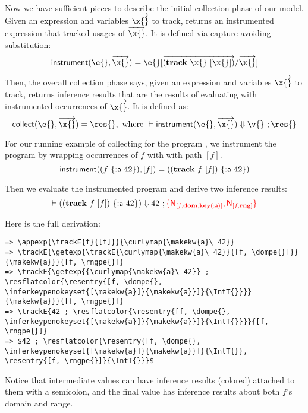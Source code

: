 Now we have sufficient pieces to describe the initial collection phase of our model.
Given an expression \e{} and variables ${\overrightarrow{\x{}}}$ to track,
\instrumentnoalign{\e{}}{\overrightarrow{\x{}}}{\ep{}}
returns an instrumented expression \ep{}
that tracked usages of $\overrightarrow{\x{}}$.
It is defined via capture-avoiding substitution:
$$
\instrumentnoalign{\e{}}{\overrightarrow{\x{}}}{\replacefor{\e{}}{\overrightarrow{\trackE{\x{}}{[\x{}]}}}{\overrightarrow{\x{}}}}
$$

Then, the overall collection phase 
\collectnoalign{\e{}}{\overrightarrow{\x{}}}{\res{}}
says, given an expression \e{}
and variables
$\overrightarrow{\x{}}$
to track,
returns inference results {\res{}}
that are the results of evaluating \e{}
with instrumented occurrences of $\overrightarrow{\x{}}$.
It is defined as:
%
$$
\collectnoalign{\e{}}{\overrightarrow{\x{}}}{\res{}}, \text{ where }
  \opsemtrack{}{\instrument{\e{}}{\overrightarrow{\x{}}}}{\v{}}{\res{}}
$$

For our running example
of collecting for the program ,
we instrument the program by wrapping occurrences of $f$ with \trackEOp{}
with path $[f]$.
$$
\instrumentnoalign{\appexp{f}{\curlymap{\makekw{a}\ 42}}}{[f]}{\appexp{\trackE{f}{[f]}}{\curlymap{\makekw{a}\ 42}}}
$$

Then we evaluate the instrumented program and derive two inference results:
$$
\opsemtrack{}{\appexp{\trackE{f}{[f]}}{\curlymap{\makekw{a}\ 42}}}{42}{\resflatcolor{\resentry{[f, \dompe{}, \inferkeypenokeyset{[\makekw{a}]}{\makekw{a}}]}{\IntT{}}, \resentry{[f, \rngpe{}]}{\IntT{}}}}
$$

Here is the full derivation:
\begin{Verbatim}[commandchars=\\\{\}, codes={\catcode`$=3\catcode`^=7}]
=> \appexp{\trackE{f}{[f]}}{\curlymap{\makekw{a}\ 42}}
=> \trackE{\getexp{\trackE{\curlymap{\makekw{a}\ 42}}{[f, \dompe{}]}}{\makekw{a}}}{[f, \rngpe{}]}
=> \trackE{\getexp{{\curlymap{\makekw{a}\ 42}} ; \resflatcolor{\resentry{[f, \dompe{}, \inferkeypenokeyset{[\makekw{a}]}{\makekw{a}}]}{\IntT{}}}}{\makekw{a}}}{[f, \rngpe{}]}
=> \trackE{42 ; \resflatcolor{\resentry{[f, \dompe{}, \inferkeypenokeyset{[\makekw{a}]}{\makekw{a}}]}{\IntT{}}}}{[f, \rngpe{}]}
=> $42 ; \resflatcolor{\resentry{[f, \dompe{}, \inferkeypenokeyset{[\makekw{a}]}{\makekw{a}}]}{\IntT{}}, \resentry{[f, \rngpe{}]}{\IntT{}}}$
\end{Verbatim}

Notice that intermediate values can have inference results (colored) attached to them with a semicolon,
and the final value has inference results about both $f$'s domain and range.

